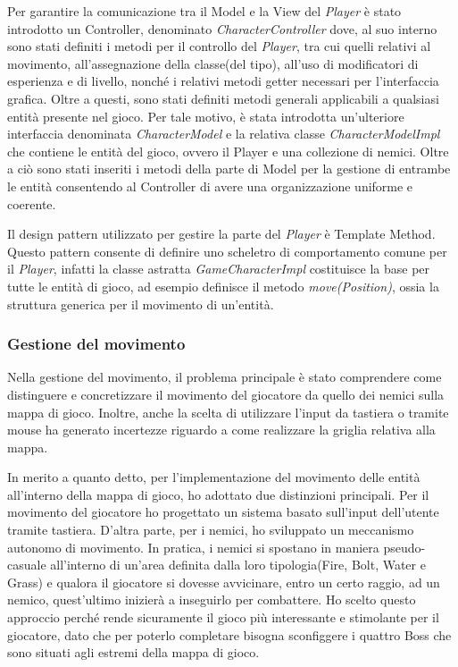 \documentclass[a4paper,12pt]{report}
\begin{document}
Per garantire la comunicazione tra il Model e la View del \textit{Player} è stato introdotto un Controller, denominato \textit{CharacterController} dove, al suo interno sono stati definiti i metodi per il controllo del \textit{Player}, tra cui quelli relativi al movimento, all'assegnazione della classe(del tipo), all'uso di modificatori di esperienza e di livello, nonché i relativi metodi getter necessari per l'interfaccia grafica.
Oltre a questi, sono stati definiti metodi generali applicabili a qualsiasi entità presente nel gioco. 
Per tale motivo, è stata introdotta un'ulteriore interfaccia denominata \textit{CharacterModel} e la relativa classe \textit{CharacterModelImpl} che contiene le entità del gioco, ovvero il Player e una collezione di nemici. Oltre a ciò sono stati inseriti i metodi della parte di Model per la gestione di entrambe le entità consentendo al Controller di avere una organizzazione uniforme e coerente.

Il design pattern utilizzato per gestire la parte del \textit{Player} è Template Method. Questo pattern consente di definire uno scheletro di comportamento comune per il \textit{Player}, infatti la classe astratta \textit{GameCharacterImpl} costituisce la base per tutte le entità di gioco, ad esempio definisce il metodo \textit{move(Position)}, ossia la struttura generica per il movimento di un'entità.

\subsubsection{Gestione del movimento}
Nella gestione del movimento, il problema principale è stato comprendere come distinguere e concretizzare il movimento del giocatore da quello dei nemici sulla mappa di gioco. Inoltre, anche la scelta di utilizzare l'input da tastiera o tramite mouse ha generato incertezze riguardo a come realizzare la griglia relativa alla mappa.

In merito a quanto detto, per l'implementazione del movimento delle entità all'interno della mappa di gioco, ho adottato due distinzioni principali. Per il movimento del giocatore ho progettato un sistema basato sull'input dell'utente tramite tastiera. D'altra parte, per i nemici, ho sviluppato un meccanismo autonomo di movimento. In pratica, i nemici si spostano in maniera pseudo-casuale all'interno di un'area definita dalla loro tipologia(Fire, Bolt, Water e Grass) e qualora il giocatore si dovesse avvicinare, entro un certo raggio, ad un nemico, quest'ultimo inizierà a inseguirlo per combattere. Ho scelto questo approccio perché rende sicuramente il gioco più interessante e stimolante per il giocatore, dato che per poterlo completare bisogna sconfiggere i quattro Boss che sono situati agli estremi della mappa di gioco.
\end{document}
